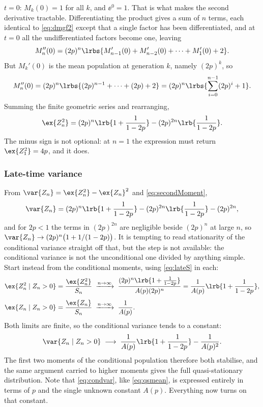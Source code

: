 $t=0$: $M_k(0)=1$ for all $k$, and $\ee^0=1$. That is what makes the second
derivative tractable. Differentiating the product gives a sum of $n$ terms, each
identical to \cref{eq:dmgf2} except that a single factor has been differentiated,
and at $t=0$ all the undifferentiated factors become one, leaving
\begin{equation*}
M_n''(0) = (2p)^n\lrbs{M_{n-1}'(0) + M_{n-2}'(0) + \cdots + M_1'(0) + 2}.
\end{equation*}
But $M_k'(0)$ is the mean population at generation $k$, namely $(2p)^k$, so
\begin{equation*}
M_n''(0) = (2p)^n\lrbs{(2p)^{n-1} + \cdots + (2p) + 2}
= (2p)^n\lrbs{\sum_{i=0}^{n-1}(2p)^i + 1}.
\end{equation*}
Summing the finite geometric series and rearranging,
\begin{equation}
\label{eq:secondMoment}
\ex{Z_n^2} = (2p)^n\lrb{1+\frac{1}{1-2p}} - (2p)^{2n}\lrb{\frac{1}{1-2p}} .
\end{equation}
The minus sign is not optional: at $n=1$ the expression must return
$\ex{Z_1^2}=4p$, and it does.

\subsubsection{Late-time variance}

From $\var{Z_n} = \ex{Z_n^2}-\ex{Z_n}^2$ and \cref{eq:secondMoment},
\begin{equation*}
\var{Z_n} = (2p)^n\lrb{1+\frac{1}{1-2p}} - (2p)^{2n}\lrb{\frac{1}{1-2p}} - (2p)^{2n},
\end{equation*}
and for $2p<1$ the terms in $(2p)^{2n}$ are negligible beside $(2p)^n$ at large
$n$, so $\var{Z_n}\to(2p)^n\bigl(1+1/(1-2p)\bigr)$. It is tempting to read
stationarity of the conditional variance straight off that, but the step is not
available: the conditional variance is not the unconditional one divided by
anything simple. Start instead from the conditional moments, using
\cref{eq:lateS} in each:
\begin{align*}
\ex{Z_n^2\mid Z_n>0} &= \frac{\ex{Z_n^2}}{S_n}
\;\xrightarrow{n\to\infty}\;
\frac{(2p)^n\lrb{1+\frac{1}{1-2p}}}{A(p)(2p)^n}
= \frac{1}{A(p)}\lrb{1+\frac{1}{1-2p}},\\[4pt]
\ex{Z_n\mid Z_n>0} &= \frac{\ex{Z_n}}{S_n}
\;\xrightarrow{n\to\infty}\;
\frac{1}{A(p)} .
\end{align*}
Both limits are finite, so the conditional variance tends to a constant:
\begin{equation}
\label{eq:condvar}
\var{Z_n\mid Z_n>0} \;\longrightarrow\;
\frac{1}{A(p)}\lrb{1+\frac{1}{1-2p}} - \frac{1}{A(p)^2} .
\end{equation}
The first two moments of the conditional population therefore both stabilise, and
the same argument carried to higher moments gives the full quasi-stationary
distribution. Note that \cref{eq:condvar}, like \cref{eq:qsmean}, is expressed
entirely in terms of $p$ and the single unknown constant $A(p)$. Everything now
turns on that constant.

